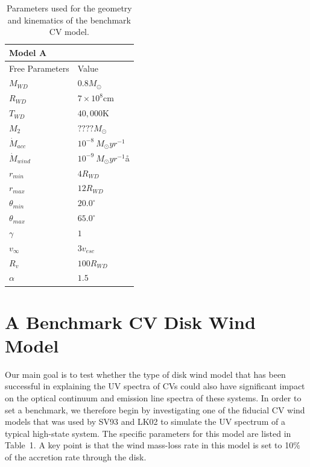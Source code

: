 \documentclass[preprint, a4paper, 11pt]{aastex}
\begin{document}
%
%

\begin{table}
\centering
\begin{tabular}{p{3cm}p{4cm}}
Model A \\
\hline Free Parameters 	&	 Value \\ 
\hline \hline 
$M_{WD}$ 	 &	 $0.8 M_{\odot}$ \\ 
$R_{WD}$ 	 &	 $7\times10^{8}$cm\\ 
$T_{WD}$ 	 &	 $40,000$K\\
$M_{2}$ 	 &	 $???? M_{\odot}$ \\ 
$\dot{M}_{acc}$ 	 &	 $10^{-8}~M_{\odot}yr^{-1}$\\ 
$\dot{M}_{wind}$  &	$10^{-9}~M_{\odot}yr^{-1}$å\\ 
$r_{min}$ 	&	 $4 R_{WD}$\\ 
$r_{max}$ 	&	 $12 R_{WD}$ \\ 
$\theta_{min}$ 	&	 $20.0^{\circ}$ \\ 
$\theta_{max}$ 	&	 $65.0^{\circ}$ \\ 
$\gamma$ 	&	 $1$ \\ 
$v_{\infty}$ 	&	 $3v_{esc}$ \\ 
$R_v$ 	        &	 $100 R_{WD}$ \\ 
$\alpha$ 	&	 $1.5$ \\
\end{tabular}
\centering
\caption{
Parameters used for the geometry and kinematics of the benchmark CV model.}
\label{wind_param}
\end{table}

\section{A Benchmark CV Disk Wind Model}

Our main goal is to test whether the type of disk wind model that has
been successful in explaining the UV spectra of CVs could also have 
significant impact on the optical continuum and emission line spectra
of these systems. In order to set a benchmark, we therefore begin by
investigating one of the fiducial CV wind models that was used by SV93
and LK02 to simulate the UV spectrum of a typical high-state
system. The specific parameters for this model are listed in
Table~1. A key point is that the wind mass-loss rate in this model is
set to 10$\%$ of the accretion rate through the disk.
\end{document}
